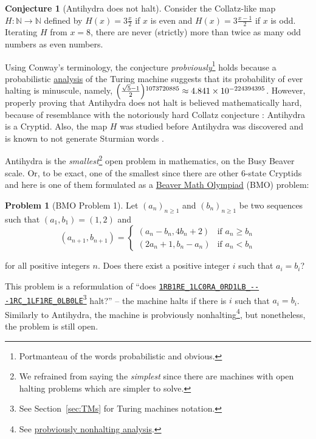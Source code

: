\documentclass[a4paper,british]{article}
\theoremstyle{definition} %
\newtheorem{conjecture}{Conjecture}[section]
\newtheorem{problem}{Problem}[section]
\numberwithin{equation}{section}
\theoremstyle{definition} %
\newcommand{\tm}[1]{\href{https://bbchallenge.org/#1}{\texttt{\nolinkurl{#1}}}}
\begin{document}
\begin{conjecture}[Antihydra does not halt]
    Consider the Collatz-like map $H: \mathbb{N} \to \mathbb{N}$ defined by $H(x) = 3\frac{x}{2}$ if $x$ is even and $H(x) = 3\frac{x-1}{2}$ if $x$ is odd. Iterating $H$ from $x=8$, there are never (strictly) more than twice as many odd numbers as even numbers.
\end{conjecture}

Using Conway's terminology, the conjecture \textit{probviously}\footnote{Portmanteau of the words probabilistic and obvious.} holds because a probabilistic \href{https://wiki.bbchallenge.org/w/index.php?title=Antihydra}{analysis} of the Turing machine suggests that its probability of ever halting is minuscule, namely, $\smash{\left(\frac{\sqrt{5}-1}{2}\right)}^{1073720885}\approx 4.841\times 10^{-224394395}$. However, properly proving that Antihydra does not halt is believed mathematically hard, because of resemblance with the notoriously hard Collatz conjecture \cite{LagariasCollatz}: Antihydra is a Cryptid. Also, the map $H$ was studied before Antihydra was discovered and is known to not generate Sturmian words \cite{DUBICKAS_2009}.

Antihydra is the \textit{smallest}\footnote{We refrained from saying the \textit{simplest} since there are machines with open halting problems which are simpler to solve.} open problem in mathematics, on the Busy Beaver scale. Or, to be exact, one of the smallest since there are other 6-state Cryptids and here is one of them formulated as a \href{https://wiki.bbchallenge.org/wiki/Beaver_Math_Olympiad}{Beaver Math Olympiad} (BMO) problem:

\begin{problem}[BMO Problem 1]
Let $(a_n)_{n \ge 1}$ and $(b_n)_{n \ge 1}$ be two sequences such that $(a_1, b_1) = (1, 2)$ and
$$(a_{n+1}, b_{n+1}) = \begin{cases}
        (a_n-b_n, 4b_n+2) & \text{if }a_n \ge b_n \\
        (2a_n+1, b_n-a_n) & \text{if }a_n < b_n
    \end{cases}$$

\noindent for all positive integers $n$. Does there exist a positive integer $i$ such that $a_i = b_i$?
\end{problem}

This problem is a reformulation of  ``does \tm{1RB1RE_1LC0RA_0RD1LB_---1RC_1LF1RE_0LB0LE}\footnote{See Section~\ref{sec:TMs} for Turing machines notation.} halt?'' -- the machine halts if there is $i$ such that $a_i = b_i$. Similarly to Antihydra, the machine is probviously nonhalting\footnote{See \href{https://wiki.bbchallenge.org/wiki/1RB1RE_1LC0RA_0RD1LB_---1RC_1LF1RE_0LB0LE}{probviously nonhalting analysis}. }, but nonetheless, the problem is still open.
\end{document}
